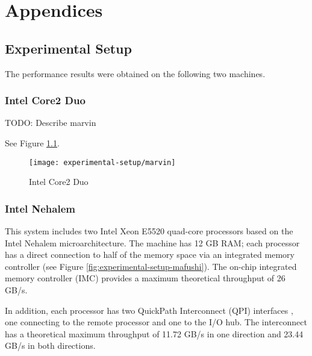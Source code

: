 
\part{Appendices}
\label{part:appendices}

\chapter{Experimental Setup}
\label{chap:experimental-setup}

The performance results were obtained on the following two machines.

\section{Intel Core2 Duo}
\label{sec:experimental-setup-marvin}

TODO: Describe marvin

See Figure \ref{fig:experimental-setup-marvin}.

\begin{figure}[htb]
  \centering
  \texttt{[image: experimental-setup/marvin]}
  \caption[Intel Core2 Duo]{Intel Core2 Duo}
  \label{fig:experimental-setup-marvin}
\end{figure}

\section{Intel Nehalem}
\label{sec:experimental-setup-mafushi}

This system includes two Intel Xeon E5520 quad-core processors based
on the Intel Nehalem microarchitecture. The machine has 12 GB RAM;
each processor has a direct connection to half of the memory space via
an integrated memory controller (see Figure
\ref{fig:experimental-setup-mafushi}). The on-chip integrated memory
controller (IMC) provides a maximum theoretical throughput of 26 GB/s.

In addition, each processor has two QuickPath Interconnect (QPI)
interfaces \cite{Maddox2009}, one connecting to the remote processor
and one to the I/O hub. The interconnect has a theoretical maximum
throughput of 11.72 GB/s in one direction and 23.44 GB/s in both
directions.


